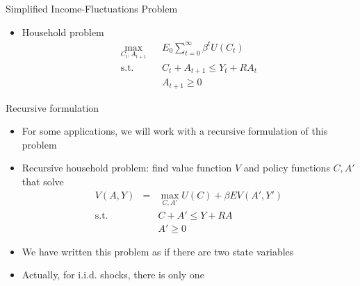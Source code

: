 \documentclass[9pt]{beamer}
\newcommand{\bit}{\begin{itemize}}
\newcommand{\eit}{\end{itemize}}
\newcommand{\bc}{\color{blue}}
\begin{document}
\begin{frame}{Simplified Income-Fluctuations Problem}

\bit
\setlength\itemsep{1.5em}

\item Household problem
\begin{eqnarray}
\max_{C_t, A_{t+1}} && E_0 \sum_{t=0}^{\infty} \beta^t U(C_t) \nonumber \\
\text{s.t.} && C_t + A_{t+1} \leq Y_t + R A_t \nonumber \\
&& A_{t+1} \geq 0 \nonumber
\end{eqnarray}


\eit

\end{frame}


\begin{frame}{Recursive formulation}

\bit
\setlength\itemsep{2em}

\item For some applications, we will work with a {\bc recursive} formulation of this problem

\item Recursive household problem: find value function $V$ and policy functions $C,A'$ that solve
\begin{eqnarray}
V(A, Y) &=& \max_{C, A'} U(C) + \beta E V(A', Y') \nonumber \\
\text{s.t.} && C + A' \leq Y + R A \nonumber \\
&& A' \geq 0 \nonumber
\end{eqnarray}

\item We have written this problem as if there are two {\bc state variables}

\item Actually, for i.i.d. shocks, there is only one


\eit

\end{frame}
\end{document}
